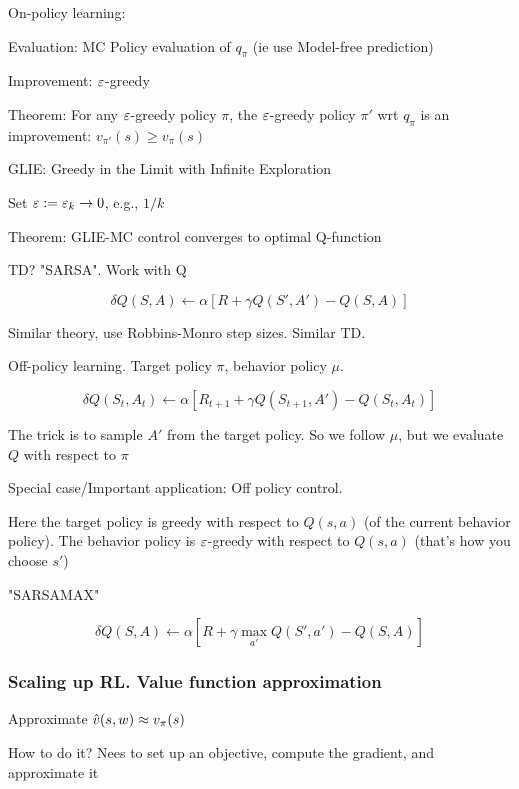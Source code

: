 \documentclass[english]{article}
\begin{document}
\item On-policy learning: 

Evaluation: MC Policy evaluation of $q_\pi$ (ie use Model-free prediction)

Improvement: $\varepsilon$-greedy

\item Theorem: For any $\varepsilon$-greedy policy $\pi$, the $\varepsilon$-greedy policy $\pi'$ wrt $q_\pi$ is an improvement: $v_{\pi'}(s) \ge v_\pi(s)$

\item GLIE: Greedy in the Limit with Infinite Exploration

Set $\varepsilon:=\varepsilon_k\to 0$, e.g., $1/k$


Theorem: GLIE-MC control converges to optimal Q-function

\item TD? "SARSA". Work with Q

$$\delta Q(S,A)
\gets
\alpha [
R+\gamma Q(S',A')-Q(S,A)]
$$

Similar theory, use Robbins-Monro step sizes. Similar TD.

\item Off-policy learning. Target policy $\pi$, behavior policy $\mu$. 

$$\delta Q(S_t,A_t)
\gets
\alpha [
R_{t+1}+\gamma Q(S_{t+1},A')-Q(S_{t},A_{t})]
$$

The trick is to sample $A'$ from the target policy. So we follow $\mu$, but we evaluate $Q$ with respect to $\pi$

\item Special case/Important application: Off policy control. 

Here the target policy is greedy with respect to $Q(s,a)$ (of the current behavior policy). The behavior policy is $\varepsilon$-greedy with respect to $Q(s,a)$ (that's how you choose $s'$)

"SARSAMAX"

$$\delta Q(S,A)
\gets
\alpha [
R+\gamma \max_{a'} Q(S',a')-Q(S,A)]
$$


\eenum 


\subsubsection{Scaling up RL. Value function approximation}
\benum
\item Approximate $\hat{v} (s,w) \approx v_\pi(s)$

How to do it? Nees to set up an objective, compute the gradient, and approximate it
\end{document}

